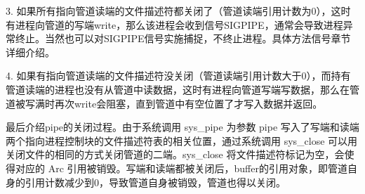 3. 如果所有指向管道读端的文件描述符都关闭了（管道读端引用计数为0），这时有进程向管道的写端write，那么该进程会收到信号SIGPIPE，通常会导致进程异常终止。当然也可以对SIGPIPE信号实施捕捉，不终止进程。具体方法信号章节详细介绍。

4. 如果有指向管道读端的文件描述符没关闭（管道读端引用计数大于0），而持有管道读端的进程也没有从管道中读数据，这时有进程向管道写端写数据，那么在管道被写满时再次write会阻塞，直到管道中有空位置了才写入数据并返回。


最后介绍pipe的关闭过程。由于系统调⽤ sys_pipe 为参数 pipe 写⼊了写端和读端两个指向进程控制块的⽂件描述符表的相关位置，通过系统调⽤ sys_close 可以⽤关闭⽂件的相同的⽅式关闭管道的⼆端。sys_close 将⽂件描述符标记为空，会使得对应的 Arc 引⽤被销毁。写端和读端都被关闭后，buffer的引⽤对象，即管道⾃⾝的引⽤计数减少到0，导致管道⾃⾝被销毁，管道也得以关闭。



